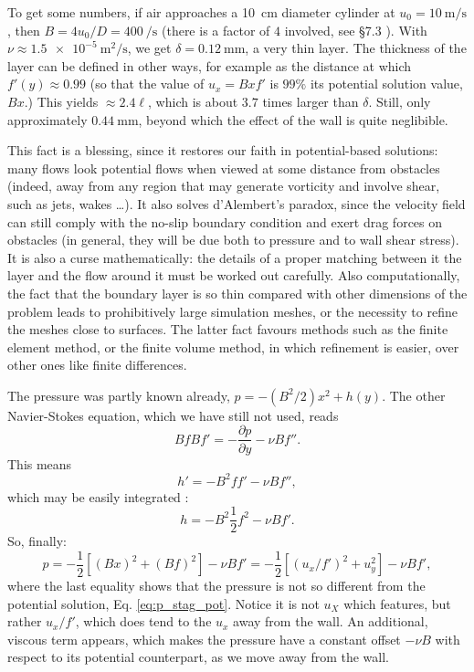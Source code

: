 To get some numbers, if air approaches a \SI{10}{\centi\meter}
diameter cylinder at $u_0=\SI{10}{\meter\per\second}$, then
$B = 4u_0/D =\SI{400}{\per\second}$ (there is a factor of $4$
involved, see \cite{white1991viscous} \S 7.3 ). With
$\nu\approx\SI{1.5e-5}{\meter\squared\per\second}$, we get
$\delta = \SI{0.12}{\milli\meter}$, a very thin layer. The thickness
of the layer can be defined in other ways, for example as the distance
at which $f'(y) \approx 0.99 $ (so that the value of $u_x = B x f'$ is
$99\%$ its potential solution value, $B x$.) This yields
$\approx 2.4 \ell$, which is about $3.7$ times larger than
$\delta$. Still, only approximately $ \SI{0.44}{\milli\meter}$, beyond
which the effect of the wall is quite neglibible.

This fact is a blessing, since it restores our faith in
potential-based solutions: many flows look potential flows when viewed
at some distance from obstacles (indeed, away from any region that may
generate vorticity and involve shear, such as jets, wakes \ldots). It
also solves d'Alembert's paradox, since the velocity field can still
comply with the no-slip boundary condition and exert drag forces on
obstacles (in general, they will be due both to pressure and to wall
shear stress). It is also a curse mathematically: the details of a
proper matching between it the layer and the flow around it must be
worked out carefully. Also computationally, the fact that the boundary
layer is so thin compared with other dimensions of the problem leads
to prohibitively large simulation meshes, or the necessity to refine
the meshes close to surfaces. The latter fact favours methods such as
the finite element method, or the finite volume method, in which
refinement is easier, over other ones like finite differences.

The pressure was partly known already, $p=-(B^2/2) x^2 + h(y)$. The other
Navier-Stokes equation, which we have still not used, reads
\[
B f B f'  =  - \frac{\partial p}{\partial y} -
\nu B  f'' .
\]
This means
\[
h' = - B^2 f f' - \nu B f'' ,
\]
which may be easily integrated :
\[
h = -B^2 \frac12 f^2  - \nu B f' .
\]
So, finally:
\[
p = -\frac{1}{2} \left[
  (B x)^2 +
  (B f)^2
  \right]  - \nu B f' =
 -\frac{1}{2} \left[
  (u_x / f' )^2 +
  u_y^2
  \right]  - \nu B f' ,
 \]
 where the last equality shows that the pressure is not so different
 from the potential solution, Eq. \ref{eq:p_stag_pot}.
%
 Notice it is not $u_X$ which features, but rather $u_x/f'$, which
 does tend to the $u_x$ away from the wall. An additional, viscous
 term appears, which makes the pressure have a constant offset
 $-\nu B$ with respect to its potential counterpart, as we move
 away from the wall.

